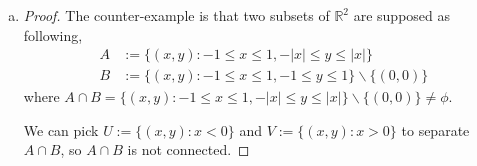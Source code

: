 \begin{Exercise}
\begin{enumerate}[a)]
\begin{proof}
\begin{enumerate}
\item [$\mathbf{Case\ 2.}$]
$a_1 \leq b_1$ and $a_2 \geq b_2$.

where $A\cap B = [b1, b2] \neq \phi$. Then $A\cup B = [a_1, a_2]$ is an interval, so is connected.

\item [$\mathbf{Case\ 3.}$]
$b_1 \leq a_1$ and $a_1 \leq b_2 < a_2$.

where $A\cap B = [a1, b2] \neq \phi$. Then $A\cup B = [b_1, a_2]$ is an interval, so is connected.

\item [$\mathbf{Case\ 4.}$]
$b_1 \leq a_1$ and $b_2 \geq a_2$.

where $A\cap B = [a1, a2] \neq \phi$. Then $A\cup B = [b_1, b_2]$ is an interval, so is connected.
\end{enumerate}
Hence, $A\cap B$ is always connected as promised.
\end{proof}

\item
\begin{proof}
The counter-example is that two subsets of $\mathbb{R}^2$ are supposed as following, 
\begin{align*}
A &:= \{(x,y) : -1\leq x \leq 1, -|x| \leq y \leq |x|\} \\
B &:=\{(x,y) : -1 \leq x \leq 1, -1 \leq y \leq 1\}\backslash\{(0,0)\}
\end{align*}
where $A\cap B = \{(x, y): -1 \leq x \leq 1, -|x| \leq y \leq |x|\} \backslash \{(0,0)\} \neq \phi.$

We can pick $U := \{(x,y):x<0\}$ and $V := \{(x,y):x>0\}$ to separate $A\cap B$, so $A\cap B$ is not connected.
\end{proof}

\end{enumerate}
\end{Exercise}